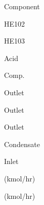 \documentclass[a4paper,portrait,12pt]{article}
\begin{document}
\begin{flushleft}
Component
\end{flushleft}





\begin{flushleft}
HE102
\end{flushleft}





\begin{flushleft}
HE103
\end{flushleft}





\begin{flushleft}
Acid
\end{flushleft}


\begin{flushleft}
Comp.
\end{flushleft}





\begin{flushleft}
Outlet
\end{flushleft}





\begin{flushleft}
Outlet
\end{flushleft}





\begin{flushleft}
Outlet
\end{flushleft}





\begin{flushleft}
Condensate
\end{flushleft}


\begin{flushleft}
Inlet
\end{flushleft}





\begin{flushleft}
(kmol/hr)
\end{flushleft}





\begin{flushleft}
(kmol/hr)
\end{flushleft}
\end{document}
